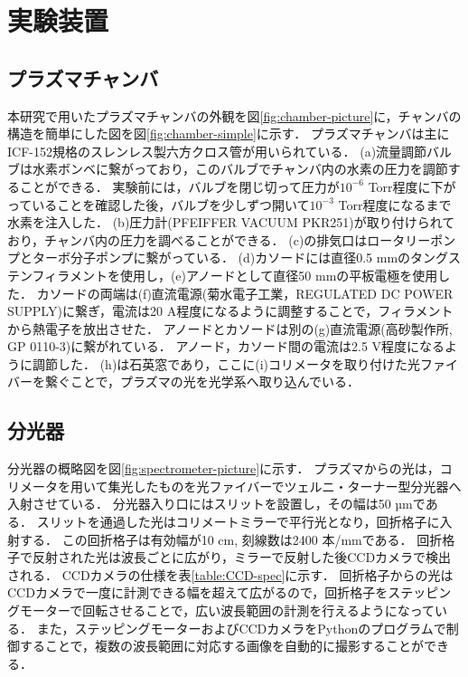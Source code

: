 \chapter{実験装置}
\section{プラズマチャンバ}
本研究で用いたプラズマチャンバの外観を図\ref{fig:chamber-picture}に，チャンバの構造を簡単にした図を図\ref{fig:chamber-simple}に示す．
プラズマチャンバは主にICF-152規格のスレンレス製六方クロス管が用いられている．
(a)流量調節バルブは水素ボンベに繋がっており，このバルブでチャンバ内の水素の圧力を調節することができる．
実験前には，バルブを閉じ切って圧力が$10^{-6}$ Torr程度に下がっていることを確認した後，バルブを少しずつ開いて$10^{-3}$ Torr程度になるまで水素を注入した．
(b)圧力計(PFEIFFER VACUUM PKR251)が取り付けられており，チャンバ内の圧力を調べることができる．
(c)の排気口はロータリーポンプとターボ分子ポンプに繋がっている．
(d)カソードには直径0.5 mmのタングステンフィラメントを使用し，(e)アノードとして直径50 mmの平板電極を使用した．
カソードの両端は(f)直流電源(菊水電子工業，REGULATED DC POWER SUPPLY)に繋ぎ，電流は20 A程度になるように調整することで，フィラメントから熱電子を放出させた．
アノードとカソードは別の(g)直流電源(高砂製作所, GP 0110-3)に繋がれている．
アノード，カソード間の電流は2.5 V程度になるように調節した．
(h)は石英窓であり，ここに(i)コリメータを取り付けた光ファイバーを繋ぐことで，プラズマの光を光学系へ取り込んでいる．

\section{分光器}
分光器の概略図を図\ref{fig:spectrometer-picture}に示す．
プラズマからの光は，コリメータを用いて集光したものを光ファイバーでツェルニ・ターナー型分光器へ入射させている．
分光器入り口にはスリットを設置し，その幅は50 µmである．
スリットを通過した光はコリメートミラーで平行光となり，回折格子に入射する．
この回折格子は有効幅が10 cm, 刻線数は2400 本/mmである．
回折格子で反射された光は波長ごとに広がり，ミラーで反射した後CCDカメラで検出される．
CCDカメラの仕様\cite{CCD-spec}を表\ref{table:CCD-spec}に示す．
回折格子からの光はCCDカメラで一度に計測できる幅を超えて広がるので，回折格子をステッピングモーターで回転させることで，広い波長範囲の計測を行えるようになっている．
また，ステッピングモーターおよびCCDカメラをPythonのプログラムで制御することで，複数の波長範囲に対応する画像を自動的に撮影することができる．

